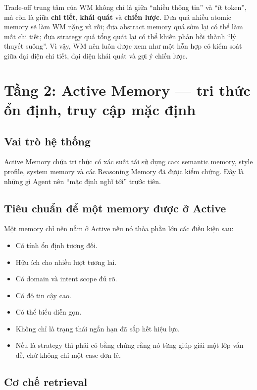 \documentclass[a4paper,12pt]{article}
\begin{document}
Trade-off trung tâm của WM không chỉ là giữa ``nhiều thông tin'' và ``ít token'', mà còn là giữa \textbf{chi tiết}, \textbf{khái quát} và \textbf{chiến lược}. Đưa quá nhiều atomic memory sẽ làm WM nặng và rối; đưa abstract memory quá sớm lại có thể làm mất chi tiết; đưa strategy quá tổng quát lại có thể khiến phản hồi thành ``lý thuyết suông''. Vì vậy, WM nên luôn được xem như một hỗn hợp có kiểm soát giữa đại diện chi tiết, đại diện khái quát và gợi ý chiến lược.

\section{Tầng 2: Active Memory --- tri thức ổn định, truy cập mặc định}

\subsection*{Vai trò hệ thống}

Active Memory chứa tri thức có xác suất tái sử dụng cao: semantic memory, style profile, system memory và các Reasoning Memory đã được kiểm chứng. Đây là những gì Agent nên ``mặc định nghĩ tới'' trước tiên.

\subsection*{Tiêu chuẩn để một memory được ở Active}

Một memory chỉ nên nằm ở Active nếu nó thỏa phần lớn các điều kiện sau:
\begin{itemize}
    \item Có tính ổn định tương đối.
    \item Hữu ích cho nhiều lượt tương lai.
    \item Có domain và intent scope đủ rõ.
    \item Có độ tin cậy cao.
    \item Có thể biểu diễn gọn.
    \item Không chỉ là trạng thái ngắn hạn đã sắp hết hiệu lực.
    \item Nếu là strategy thì phải có bằng chứng rằng nó từng giúp giải một lớp vấn đề, chứ không chỉ một case đơn lẻ.
\end{itemize}

\subsection*{Cơ chế retrieval}
\end{document}

